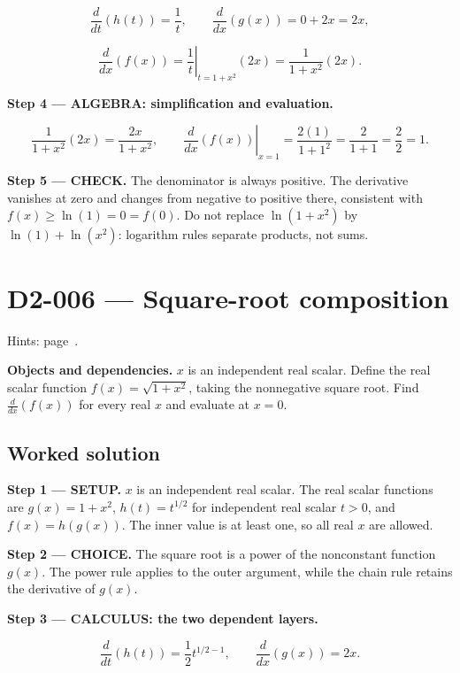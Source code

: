 \documentclass[11pt,oneside,openany]{book}
\begin{document}
\[
\frac{d}{dt}\left(h(t)\right)=\frac1t,\qquad
\frac{d}{dx}\left(g(x)\right)=0+2x=2x,
\]

\[
\frac{d}{dx}\left(f(x)\right)
=\left.\frac1t\right|_{t=1+x^2}(2x)=\frac{1}{1+x^2}(2x).
\]

\begingroup\color{AlgebraBlue}
\textbf{Step 4 --- ALGEBRA: simplification and evaluation.}

\[
\frac{1}{1+x^2}(2x)=\frac{2x}{1+x^2},\qquad
\left.\frac{d}{dx}\left(f(x)\right)\right|_{x=1}
=\frac{2(1)}{1+1^2}=\frac2{1+1}=\frac22=1.
\]

\endgroup
\textbf{Step 5 --- CHECK.} The denominator is always positive. The derivative vanishes
at zero and changes from negative to positive there, consistent with
\(f(x)\ge\ln(1)=0=f(0)\). Do not replace \(\ln(1+x^2)\) by \(\ln(1)+\ln(x^2)\):
logarithm rules separate products, not sums.
\clearpage
\section{D2-006 --- Square-root composition}
\label{problem:D2-006}
{\small Hints: page~\pageref{hints:D2-006}.}\par\medskip

\textbf{Objects and dependencies.} \(x\) is an independent real scalar. Define the real
scalar function \(f(x)=\sqrt{1+x^2}\), taking the nonnegative square root. Find
\(\frac{d}{dx}\left(f(x)\right)\) for every real \(x\) and evaluate at \(x=0\).
\subsection*{Worked solution}

\textbf{Step 1 --- SETUP.} \(x\) is an independent real scalar. The real scalar functions
are \(g(x)=1+x^2\), \(h(t)=t^{1/2}\) for independent real scalar \(t>0\), and
\(f(x)=h(g(x))\). The inner value is at least one, so all real \(x\) are allowed.

\begin{ChoiceStep}
\textbf{Step 2 --- CHOICE.} The square root is a power of the nonconstant function \(g(x)\).
The power rule applies to the outer argument, while the chain rule retains
the derivative of \(g(x)\).

\end{ChoiceStep}
\textbf{Step 3 --- CALCULUS: the two dependent layers.}

\[
\frac{d}{dt}\left(h(t)\right)=\frac12t^{1/2-1},\qquad
\frac{d}{dx}\left(g(x)\right)=2x.
\]
\end{document}
